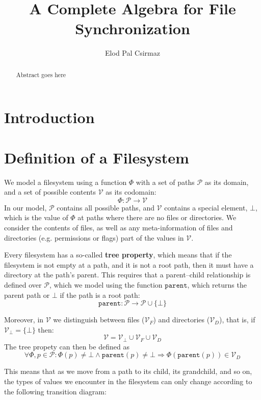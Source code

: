 \documentclass[12pt]{article}
\title{A Complete Algebra for File Synchronization}
\author{Elod Pal Csirmaz}
\newcommand{\setv}{\mathcal{V}}
\newcommand{\setvx}[1]{\mathcal{V}_{#1}}
\newcommand{\setf}{\setvx{F}}
\newcommand{\setd}{\setvx{D}}
\newcommand{\setb}{\setvx{\empt}}
\newcommand{\setp}{\mathcal{P}}
\newcommand{\empt}{\bot}
\newcommand{\parent}{\mathtt{parent}}
\newcommand{\FS}{\Phi} %
\begin{document}
\maketitle
\begin{abstract}
Abstract goes here
\end{abstract}

\section{Introduction}


\section{Definition of a Filesystem}

We model a filesystem using a function $\FS$ with a set of paths $\setp$ as its domain,
and a set of possible contents $\setv$ as its codomain:
\[ \FS : \setp \rightarrow \setv \] 
In our model, $\setp$ contains all possible paths, and $\setv$ contains a special
element, $\empt$, which is the value of $\FS$ at paths where there are no files
or directories.
We consider the contents of files, as well as any meta-information of files
and directories (e.g. permissions or flags) part of the values in $\setv$.

Every filesystem has a so-called \textbf{tree property}, which means that
if the filesystem is not empty at a path, and it is not a root path,
then it must have a directory at the path's parent.
This requires that a parent--child relationship is defined over $\setp$,
which we model using the function $\parent$, which returns the parent path
or $\empt$ if the path is a root path:
\[ \parent : \setp \rightarrow \setp \cup \{\empt\} \]

Moreover, in $\setv$ we distinguish between files ($\setf$) and directories ($\setd$), that is,
if $\setb = \{\empt\}$ then:
\[ \setv = \setb \cup \setf \cup \setd \]
The tree propety can then be defined as
\[ \forall \FS, p\in\setp : \FS(p) \neq \empt \wedge \parent(p) \neq \empt \Rightarrow \FS(\parent(p)) \in \setd \]

This means that as we move from a path to its child, its grandchild, and so on,
the types of values we encounter in the filesystem can only change according to the following
transition diagram:
\end{document}
